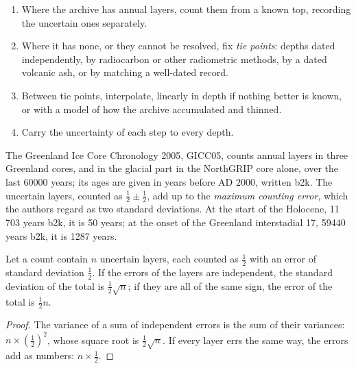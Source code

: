 \begin{method}\label{met:b2:climate-proxies:age-model}
\begin{enumerate}
  \item Where the archive has annual layers, count them from a known top, recording the uncertain
        ones separately.
  \item Where it has none, or they cannot be resolved, fix \emph{tie points}: depths dated
        independently, by radiocarbon or other radiometric methods, by a dated volcanic ash, or by
        matching a well-dated record.
  \item Between tie points, interpolate, linearly in depth if nothing better is known, or with a
        model of how the archive accumulated and thinned.
  \item Carry the uncertainty of each step to every depth.
\end{enumerate}
\end{method}

The Greenland Ice Core Chronology 2005, GICC05, counts annual layers in three Greenland cores, and
in the glacial part in the NorthGRIP core alone, over the last \num{60000} years; its ages are
given in years before AD 2000, written b2k. The uncertain layers, counted as $\frac12 \pm \frac12$,
add up to the \emph{maximum counting error}, which the authors regard as two standard deviations.
At the start of the Holocene, 11\,703 years b2k, it is 50 years; at the onset of the
Greenland interstadial 17, \num{59440} years b2k, it is \num{1287} years.

\begin{proposition}\label{prop:b2:climate-proxies:counting}
Let a count contain $n$ uncertain layers, each counted as $\frac12$ with an error of standard
deviation $\frac12$. If the errors of the layers are independent, the standard deviation of the
total is $\frac12\sqrt{n}$; if they are all of the same sign, the error of the total is
$\frac12 n$.
\end{proposition}

\begin{proof}
The variance of a sum of independent errors is the sum of their variances: $n \times
(\frac12)^2$, whose square root is $\frac12\sqrt{n}$. If every layer errs the same way, the
errors add as numbers: $n \times \frac12$.
\end{proof}

